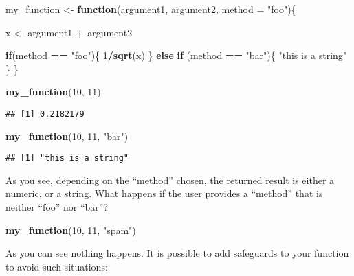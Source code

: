 \documentclass[
]{article}
\newenvironment{Shaded}{\begin{snugshade}}{\end{snugshade}}
\newcommand{\ControlFlowTok}[1]{\textcolor[rgb]{0.13,0.29,0.53}{\textbf{#1}}}
\newcommand{\DataTypeTok}[1]{\textcolor[rgb]{0.13,0.29,0.53}{#1}}
\newcommand{\DecValTok}[1]{\textcolor[rgb]{0.00,0.00,0.81}{#1}}
\newcommand{\KeywordTok}[1]{\textcolor[rgb]{0.13,0.29,0.53}{\textbf{#1}}}
\newcommand{\NormalTok}[1]{#1}
\newcommand{\OperatorTok}[1]{\textcolor[rgb]{0.81,0.36,0.00}{\textbf{#1}}}
\newcommand{\StringTok}[1]{\textcolor[rgb]{0.31,0.60,0.02}{#1}}
\begin{document}
\begin{Shaded}
\begin{Highlighting}[]
\NormalTok{my\_function \textless{}{-}}\StringTok{ }\ControlFlowTok{function}\NormalTok{(argument1, argument2, }\DataTypeTok{method =} \StringTok{"foo"}\NormalTok{)\{}
  
\NormalTok{  x \textless{}{-}}\StringTok{ }\NormalTok{argument1 }\OperatorTok{+}\StringTok{ }\NormalTok{argument2}
  
  \ControlFlowTok{if}\NormalTok{(method }\OperatorTok{==}\StringTok{ "foo"}\NormalTok{)\{}
    \DecValTok{1}\OperatorTok{/}\KeywordTok{sqrt}\NormalTok{(x)}
\NormalTok{  \} }\ControlFlowTok{else} \ControlFlowTok{if}\NormalTok{ (method }\OperatorTok{==}\StringTok{ "bar"}\NormalTok{)\{}
    \StringTok{"this is a string"}
\NormalTok{    \}}
\NormalTok{\}}

\KeywordTok{my\_function}\NormalTok{(}\DecValTok{10}\NormalTok{, }\DecValTok{11}\NormalTok{)}
\end{Highlighting}
\end{Shaded}

\begin{verbatim}
## [1] 0.2182179
\end{verbatim}

\begin{Shaded}
\begin{Highlighting}[]
\KeywordTok{my\_function}\NormalTok{(}\DecValTok{10}\NormalTok{, }\DecValTok{11}\NormalTok{, }\StringTok{"bar"}\NormalTok{)}
\end{Highlighting}
\end{Shaded}

\begin{verbatim}
## [1] "this is a string"
\end{verbatim}

As you see, depending on the ``method'' chosen, the returned result is either a numeric, or a string.
What happens if the user provides a ``method'' that is neither ``foo'' nor ``bar''?

\begin{Shaded}
\begin{Highlighting}[]
\KeywordTok{my\_function}\NormalTok{(}\DecValTok{10}\NormalTok{, }\DecValTok{11}\NormalTok{, }\StringTok{"spam"}\NormalTok{)}
\end{Highlighting}
\end{Shaded}

As you can see nothing happens. It is possible to add safeguards to your function to avoid such
situations:
\end{document}
